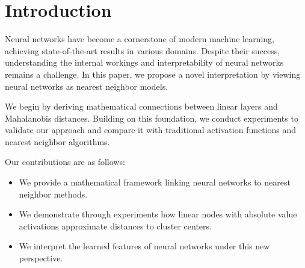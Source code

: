 
\section{Introduction}

Neural networks have become a cornerstone of modern machine learning, achieving state-of-the-art results in various domains. Despite their success, understanding the internal workings and interpretability of neural networks remains a challenge. In this paper, we propose a novel interpretation by viewing neural networks as nearest neighbor models.

We begin by deriving mathematical connections between linear layers and Mahalanobis distances. Building on this foundation, we conduct experiments to validate our approach and compare it with traditional activation functions and nearest neighbor algorithms.

Our contributions are as follows:
\begin{itemize}
    \item We provide a mathematical framework linking neural networks to nearest neighbor methods.
    \item We demonstrate through experiments how linear nodes with absolute value activations approximate distances to cluster centers.
    \item We interpret the learned features of neural networks under this new perspective.
\end{itemize}





